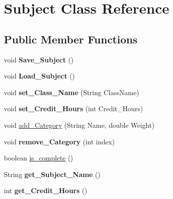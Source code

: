 \hypertarget{class_subject}{\section{Subject Class Reference}
\label{class_subject}
}
\subsection*{Public Member Functions}
\begin{DoxyCompactItemize}
\item 
\hypertarget{class_subject_a196844631f87b9011b62ab4fceb0af7d}{void {\bfseries Save\-\_\-\-Subject} ()}\label{class_subject_a196844631f87b9011b62ab4fceb0af7d}

\item 
\hypertarget{class_subject_ac45971e427d4c74803136801ef65e534}{void {\bfseries Load\-\_\-\-Subject} ()}\label{class_subject_ac45971e427d4c74803136801ef65e534}

\item 
\hypertarget{class_subject_ad748d91396246aa911d168c4c8ae685a}{void {\bfseries set\-\_\-\-Class\-\_\-\-Name} (String Class\-Name)}\label{class_subject_ad748d91396246aa911d168c4c8ae685a}

\item 
\hypertarget{class_subject_a8a583b80219ebe829a583b69c3b42ad4}{void {\bfseries set\-\_\-\-Credit\-\_\-\-Hours} (int Credit\-\_\-\-Hours)}\label{class_subject_a8a583b80219ebe829a583b69c3b42ad4}

\item 
void \hyperlink{class_subject_a3c000c62bd8009745affbd20c8a56406}{add\-\_\-\-Category} (String Name, double Weight)
\item 
\hypertarget{class_subject_a04d4c2b3a81eccef3be0ebc2a27923fd}{void {\bfseries remove\-\_\-\-Category} (int index)}\label{class_subject_a04d4c2b3a81eccef3be0ebc2a27923fd}

\item 
boolean \hyperlink{class_subject_a81f659adf6b36de9e14967e7af1c9d51}{is\-\_\-complete} ()
\item 
\hypertarget{class_subject_a959349e4415ef1034c133c1df4b673d4}{String {\bfseries get\-\_\-\-Subject\-\_\-\-Name} ()}\label{class_subject_a959349e4415ef1034c133c1df4b673d4}

\item 
\hypertarget{class_subject_a4fcd2cbf9fb848d36b4ff10c340d1f31}{int {\bfseries get\-\_\-\-Credit\-\_\-\-Hours} ()}\label{class_subject_a4fcd2cbf9fb848d36b4ff10c340d1f31}


\end{DoxyCompactItemize}
